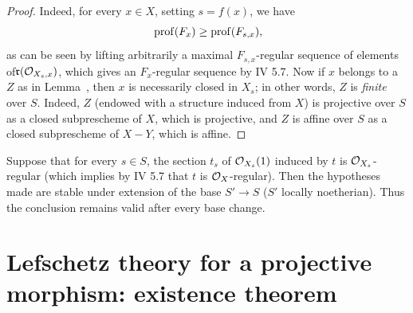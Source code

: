 \begin{proof}
Indeed, for every $x\in X$, setting $s=f(x)$, we have
\steco
\begin{equation} \label{eq:XII.16} {}\operatorname{prof}(F_x)\geq \operatorname{prof}(F_{s, x}),
\end{equation}
as can be seen by lifting arbitrarily a maximal $F_{s, x}$-regular sequence of elements of\pageoriginale $\mathfrak{r}(\mathcal O_{X_s, x})$, which gives an $F_x$-regular sequence by  IV 5.7. Now if $x$ belongs to a $Z$ as in Lemma~, then $x$ is necessarily closed in $X_s$; in other words, $Z$ is \emph{finite} over $S$. Indeed, $Z$ (endowed with a structure induced from $X$) is projective over $S$ as a closed subprescheme of $X$, which is projective, and $Z$ is affine over $S$ as a closed subprescheme of $X- Y$, which is affine.
\skipqed
\end{proof}

\begin{remarque} \label{XII.2.6}
Suppose that for every $s\in S$, the section $t_s$ of $\mathcal O_{X_s}(1)$ induced by $t$ is $\mathcal O_{X_s}$-regular (which implies by  IV 5.7 that $t$ is $\mathcal O_X$-regular). Then the hypotheses made are stable under extension of the base $S'\to S$ ($S'$ locally noetherian). Thus the conclusion remains valid after every base change.
\end{remarque}

\section[Lefschetz theory for a projective morphism: existence]{Lefschetz theory for a projective morphism: existence theorem}\label{XII.3}%


